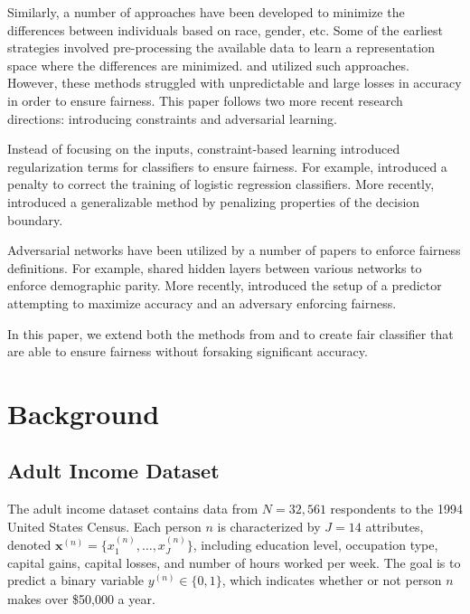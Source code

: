 \documentclass{article}
\newcommand{\bd}[1]{\boldsymbol{#1}}
\newcommand{\idx}[3][]{{#2}^{(#3)}_{#1}}
\newcommand{\bidx}[3][]{\bd{#2}^{(#3)}_{#1}}
\begin{document}
Similarly, a number of approaches have been developed to minimize the differences between individuals based on race, gender, etc. Some of the earliest strategies involved pre-processing the available data to learn a representation space where the differences are minimized. \cite{dwork2012fairness} and  \cite{feldman2015certifying} utilized such approaches. However, these methods struggled with unpredictable and large losses in accuracy in order to ensure fairness. This paper follows two more recent research directions: introducing constraints and adversarial learning.

Instead of focusing on the inputs, constraint-based learning introduced regularization terms for classifiers to ensure fairness. For example, \cite{kamishima2012fairness} introduced a penalty to correct the training of logistic regression classifiers. More recently, \cite{zafar2015fairness} introduced a generalizable method by penalizing properties of the decision boundary.

Adversarial networks have been utilized by a number of papers to enforce fairness definitions. For example, \cite{beutel2017data} shared hidden layers between various networks to enforce demographic parity. More recently, \cite{wadsworth2018achieving} introduced the setup of a predictor attempting to maximize accuracy and an adversary enforcing fairness.

In this paper, we extend both the methods from \cite{zafar2015fairness} and \cite{wadsworth2018achieving} to create fair classifier that are able to ensure fairness without forsaking significant accuracy.

\section{Background}

\subsection{Adult Income Dataset}

The adult income dataset \citep{kohavi1996scaling} contains data from $N = 32,561$ respondents to the 1994 United States Census.  Each person $n$ is characterized by $J = 14$ attributes, denoted $\bidx x n = \{\idx[1] x n, \ldots, \idx[J] x n\}$, including education level, occupation type, capital gains, capital losses, and number of hours worked per week.  The goal is to predict a binary variable $\idx y n \in \{0, 1\}$, which indicates whether or not person $n$ makes over \$50,000 a year.
\end{document}
